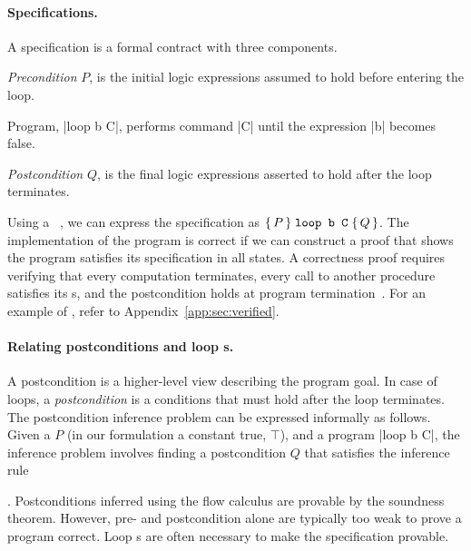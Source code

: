 \paragraph*{Specifications.}
A {specification} is a formal contract with three components.
\begin{enumerate*}
    \item \emph{Precondition} \(P\), is the initial logic expressions assumed to hold before entering the loop.
    \item Program, \pr|loop b C|, performs command \pr|C| until the expression \pr|b| becomes false.
    \item \emph{Postcondition} \(Q\), is the final logic expressions asserted to hold after the loop terminates.
\end{enumerate*}
Using a ~\cite{hoare1969}, we can express the specification as \(\Hoare{P}{\prm{loop b C}}{Q}\).
The implementation of the program is correct if we can construct a proof that shows the program satisfies its specification in all states.
A correctness proof requires verifying that every computation terminates, every call to another procedure satisfies its s, and the postcondition holds at program termination~\cite{furia2010}.
For an example of , refer to Appendix~\ref{app:sec:verified}.

\paragraph*{Relating postconditions and loop s.}
A postcondition is a higher-level view describing the program goal.
In case of loops, a \emph{postcondition} is a conditions that must hold after the loop terminates.
The postcondition inference problem can be expressed informally as follows.
Given a  \(P\) (in our formulation a constant true, \(\top\)), and a program \pr|loop b C|,
the inference problem involves finding a postcondition \(Q\) that satisfies the inference rule
\begin{prooftree} %
\end{prooftree}.
Postconditions inferred using the flow calculus are provable by the soundness theorem.
However, pre- and postcondition alone are typically too weak to prove a program correct.
Loop s are often necessary to make the specification provable.

